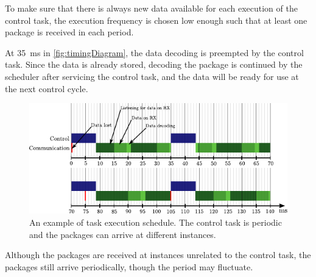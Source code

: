 To make sure that there is always new data available for each execution of the control task, the execution frequency is chosen low enough such that at least one package is received in each period.

At \SI{35}{ms} in \autoref{fig:timingDiagram}, the data decoding is preempted by the control task. Since the data is already stored, decoding the package is continued by the scheduler after servicing the control task, and the data will be ready for use at the next control cycle.

\begin{figure}[H]
    \flushleft
    \includegraphics[width =.95\textwidth]{figures/timingDiagram}	
    \caption{An example of task execution schedule. The control task is periodic and the packages can arrive at different instances.} 
    \label{fig:timingDiagram}
\end{figure}

Although the packages are received at instances unrelated to the control task, the packages still arrive periodically, though the period may fluctuate.
\newpage